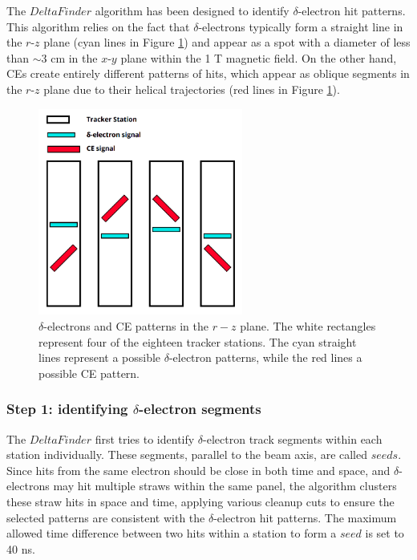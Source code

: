 The $DeltaFinder$ algorithm has been designed 
to identify $\delta$-electron 
hit patterns. This 
algorithm relies on the 
fact that $\delta$-electrons typically 
form a straight line in 
the $r$-$z$ plane (cyan lines in Figure 
\ref{fig:yzviewdelta}) 
and appear as a spot with a diameter 
of less than $\sim$3 cm in the 
$x$-$y$ plane within the 1 T  
magnetic field. On the other hand, 
CEs create entirely different 
patterns of hits, which appear as oblique segments in 
the $r$-$z$ plane due to their 
helical trajectories (red lines 
in Figure \ref{fig:yzviewdelta}). 
\begin{figure}[!h]
    \centering
    \includegraphics[width =0.6\textwidth]{figures/png/Screenshot_20240811_123048.png}
    \caption[$\delta$-electrons and CE patterns in $r-z$ plane.]{
        $\delta$-electrons and CE patterns in the $r-z$ plane. 
        The white rectangles represent four of the eighteen tracker stations. 
        The cyan straight lines represent a possible $\delta$-electron 
        patterns, while the red lines a possible CE pattern.
        }
    \label{fig:yzviewdelta}
\end{figure}
\subsubsection{Step 1: identifying $\delta$-electron segments}
The $DeltaFinder$ first tries to 
identify $\delta$-electron track 
segments within each station 
individually. These segments, 
parallel to the beam axis, are 
called $seeds$. Since hits 
from the same electron should be 
close in both time and space, 
and $\delta$-electrons may hit 
multiple straws within the 
same panel, the algorithm clusters 
these straw hits in space and time, applying various 
cleanup cuts to ensure the 
selected patterns are consistent with the 
$\delta$-electron hit patterns. 
The maximum allowed time 
difference between two hits within 
a station to form a $seed$ is set to 40 ns.

